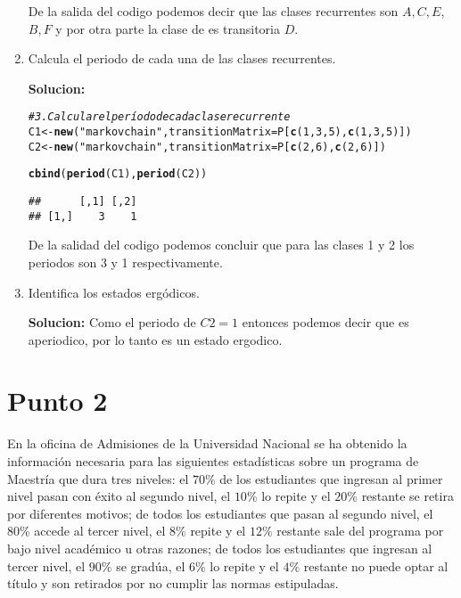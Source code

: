 \documentclass[11pt]{article}\usepackage[]{graphicx}\usepackage[table]{xcolor}
\makeatletter
\newcommand{\hlnum}[1]{\textcolor[rgb]{0.686,0.059,0.569}{#1}}%
\newcommand{\hlstr}[1]{\textcolor[rgb]{0.192,0.494,0.8}{#1}}%
\newcommand{\hlcom}[1]{\textcolor[rgb]{0.678,0.584,0.686}{\textit{#1}}}%
\newcommand{\hlstd}[1]{\textcolor[rgb]{0.345,0.345,0.345}{#1}}%
\newcommand{\hlkwb}[1]{\textcolor[rgb]{0.69,0.353,0.396}{#1}}%
\newcommand{\hlkwc}[1]{\textcolor[rgb]{0.333,0.667,0.333}{#1}}%
\newcommand{\hlkwd}[1]{\textcolor[rgb]{0.737,0.353,0.396}{\textbf{#1}}}%
\newenvironment{kframe}{%
 \def\at@end@of@kframe{}%
 \ifinner\ifhmode%
  \def\at@end@of@kframe{\end{minipage}}%
  \begin{minipage}{\columnwidth}%
 \fi\fi%
 \def\FrameCommand##1{\hskip\@totalleftmargin \hskip-\fboxsep
 \colorbox{shadecolor}{##1}\hskip-\fboxsep
     \hskip-\linewidth \hskip-\@totalleftmargin \hskip\columnwidth}%
 \MakeFramed {\advance\hsize-\width
   \@totalleftmargin\z@ \linewidth\hsize
   \@setminipage}}%
 {\par\unskip\endMakeFramed%
 \at@end@of@kframe}
\newenvironment{knitrout}{}{} %
\makeatother
\begin{document}
\begin{enumerate}
    De la salida del codigo podemos decir que las clases recurrentes son ${A,C,E}$, 
    ${B,F}$ y por otra parte la clase de es transitoria ${D}$.   
    
    \item Calcula el periodo de cada una de las clases recurrentes.
    
    \textbf{Solucion:}

\begin{knitrout}
\color{fgcolor}\begin{kframe}
\begin{alltt}
\hlcom{# 3. Calcular el período de cada clase recurrente}
\hlstd{C1} \hlkwb{<-} \hlkwd{new}\hlstd{(}\hlstr{"markovchain"}\hlstd{,} \hlkwc{transitionMatrix} \hlstd{= P[}\hlkwd{c}\hlstd{(}\hlnum{1}\hlstd{,}\hlnum{3}\hlstd{,}\hlnum{5}\hlstd{),} \hlkwd{c}\hlstd{(}\hlnum{1}\hlstd{,}\hlnum{3}\hlstd{,}\hlnum{5}\hlstd{)])}
\hlstd{C2} \hlkwb{<-} \hlkwd{new}\hlstd{(}\hlstr{"markovchain"}\hlstd{,} \hlkwc{transitionMatrix} \hlstd{= P[}\hlkwd{c}\hlstd{(}\hlnum{2}\hlstd{,}\hlnum{6}\hlstd{),} \hlkwd{c}\hlstd{(}\hlnum{2}\hlstd{,}\hlnum{6}\hlstd{)])}

\hlkwd{cbind}\hlstd{(}\hlkwd{period}\hlstd{(C1),} \hlkwd{period}\hlstd{(C2))}
\end{alltt}
\begin{verbatim}
##      [,1] [,2]
## [1,]    3    1
\end{verbatim}
\end{kframe}
\end{knitrout}

    De la salidad del codigo podemos concluir que para las clases 1 y 2 los periodos
    son 3 y 1 respectivamente.

    \item Identifica los estados ergódicos.
    
    \textbf{Solucion:} Como el periodo de $C2 = 1$ entonces podemos decir que es 
    aperiodico, por lo tanto es un estado ergodico.
    
    
\end{enumerate}

\section*{Punto 2}

En la oficina de Admisiones de la Universidad Nacional se ha obtenido la información necesaria para las siguientes estadísticas sobre un programa de Maestría que dura tres niveles: el $70 \%$ de los estudiantes que ingresan al primer nivel pasan con éxito al segundo nivel, el $10 \%$ lo repite y el $20 \%$ restante se retira por diferentes motivos; de todos los estudiantes que pasan al segundo nivel, el $80 \%$ accede al tercer nivel, el $8 \%$ repite y el $12 \%$ restante sale del programa por bajo nivel académico u otras razones; de todos los estudiantes que ingresan al tercer nivel, el $90 \%$ se gradúa, el $6 \%$ lo repite y el $4 \%$ restante no puede optar al título y son retirados por no cumplir las normas estipuladas.
\end{document}
